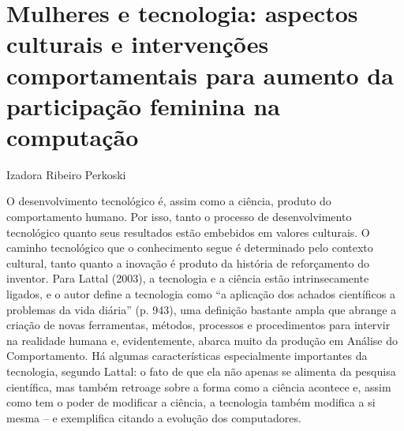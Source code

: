 \setcounter{footnote}{0}
\setcounter{figure}{0}
\setcounter{table}{0}
\chapter*{Mulheres e tecnologia: aspectos culturais e intervenções comportamentais para aumento da participação feminina na computação}
\begin{flushright}
\begin{small}
    Izadora Ribeiro Perkoski  
\end{small}
\vspace{1cm}
\end{flushright}

O desenvolvimento tecnológico é, assim como a ciência, produto do comportamento humano. Por isso, tanto o processo de desenvolvimento tecnológico quanto seus resultados estão embebidos em valores culturais. O caminho tecnológico que o conhecimento segue é determinado pelo contexto cultural, tanto quanto a inovação é produto da história de reforçamento do inventor. Para Lattal (2003), a tecnologia e a ciência estão intrinsecamente ligados, e o autor define a tecnologia como “a aplicação dos achados científicos a problemas da vida diária” (p. 943), uma definição bastante ampla que abrange a criação de novas ferramentas, métodos, processos e procedimentos para intervir na realidade humana e, evidentemente, abarca muito da produção em Análise do Comportamento. Há algumas características especialmente importantes da tecnologia, segundo Lattal: o fato de que ela não apenas se alimenta da pesquisa científica, mas também retroage sobre a forma como a ciência acontece e, assim como tem o poder de modificar a ciência, a tecnologia também modifica a si mesma – e exemplifica citando a evolução dos computadores.

